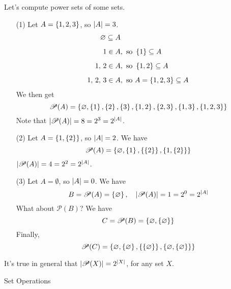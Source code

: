 
\begin{example}
Let's compute power sets of some sets.
\begin{itemize}[itemsep=0.5em]
\item[(1)] Let $A = \left\{1,2,3\right\}$, so $\left\lvert A\right\rvert = 3$.
\begin{align*}
\varnothing \subseteq A&\\[0.5em]
1 \in A&, \text{ so } \left\{1\right\} \subseteq A\\[0.5em]
1,\,2 \in A&, \text{ so } \left\{1,2\right\} \subseteq A\\[0.5em]
1,\,2,\,3 \in A&, \text{ so } A = \left\{1,2,3\right\} \subseteq A
\end{align*}
We then get
\[\mathscr{P}(A) = \left\{\varnothing,\left\{1\right\},\left\{2\right\},\left\{3\right\},\left\{1,2\right\},\left\{2,3\right\},\left\{1,3\right\},\left\{1,2,3\right\}\right\}\]
Note that $\left\lvert\mathscr{P}(A)\right\rvert = 8 = 2^3 = 2^{\left\lvert A\right\rvert}$.

\item[(2)] Let $A = \left\{1,\left\{2\right\}\right\}$, so $\left\lvert A\right\rvert = 2$. We have
\[\mathscr{P}(A) = \left\{\varnothing,\left\{1\right\},\left\{\left\{2\right\}\right\},\left\{1,\left\{2\right\}\right\}\right\}\]
$\left\lvert\mathscr{P}(A)\right\rvert = 4 = 2^2 = 2^{\left\lvert A\right\rvert}$.

\item[(3)] Let $A = \emptyset$, so $\left\lvert A\right\rvert = 0$. We have
\[B = \mathscr{P}(A) = \left\{\varnothing\right\},\quad \left\lvert\mathscr{P}(A)\right\rvert = 1 = 2^0 = 2^{\left\lvert A\right\rvert}\]
What about $\mathscr{P}(B)$? We have
\[C = \mathscr{P}(B) = \left\{\varnothing,\left\{\varnothing\right\}\right\}\]
Finally,
\[\mathscr{P}(C) = \left\{\varnothing,\left\{\varnothing\right\},\left\{\left\{\varnothing\right\}\right\},\left\{\varnothing,\left\{\varnothing\right\}\right\}\right\}\]
\end{itemize}

\vspace*{1em}

\begin{remark}
It's true in general that $\left\lvert\mathscr{P}(X)\right\rvert = 2^{\left\lvert X\right\rvert}$, for any set $X$.
\end{remark}
\end{example}

\vspace*{2em}

\begin{mdframed}
\begin{center}
{\Large Set Operations}\label{set-operations}
\end{center}
\end{mdframed}

